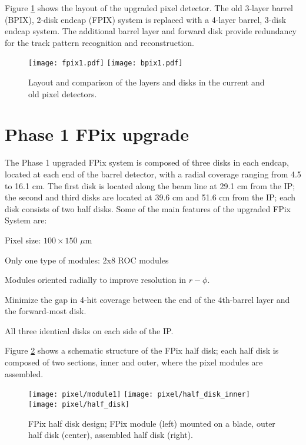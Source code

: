 Figure \ref{fig:new_pix} shows the layout of the upgraded pixel detector. The old 3-layer barrel (BPIX), 2-disk endcap (FPIX) system is replaced with a 4-layer barrel, 3-disk endcap system. The additional barrel layer and forward disk provide redundancy for the track pattern recognition and reconstruction.

\begin{figure}[!h]
\centering
\texttt{[image: fpix1.pdf]}
\texttt{[image: bpix1.pdf]}
\caption[Layout of the upgraded and old pixel detectors.]{Layout and comparison of the layers and disks in the current and old pixel detectors.}\label{fig:new_pix}
\end{figure}

\section{Phase 1 FPix upgrade}

The Phase 1 upgraded FPix system is composed of three disks in each endcap, located at each end of the barrel detector, with a radial coverage ranging from 4.5 to 16.1 cm. The first disk is located along the beam line at 29.1 cm from the IP; the second and third disks are located at 39.6 cm and 51.6 cm from the IP; each disk consists of two half disks. Some of the main features of the upgraded FPix System are:
\bit
\item Pixel size: $100 \times 150$ $\mu$m 
\item Only one type of modules: 2x8 ROC modules
\item Modules oriented radially to improve resolution in $r-\phi$.
\item Minimize the gap in 4-hit coverage between the end of the 4th-barrel layer and the forward-most disk.
\item All three identical disks on each side of the IP.
\eit

Figure \ref{fig:fpix_layout} shows a schematic structure of the FPix half disk; each half disk is composed of two sections, inner and outer, where the pixel modules are assembled.

\begin{figure}[!h]
  \centering
  \texttt{[image: pixel/module1]}
  \texttt{[image: pixel/half\_disk\_inner]}
  \texttt{[image: pixel/half\_disk]}
\caption[FPix half disk design.]{FPix half disk design; FPix module (left) mounted on a blade, outer half disk (center), assembled half disk (right).}\label{fig:fpix_layout}
\end{figure}

